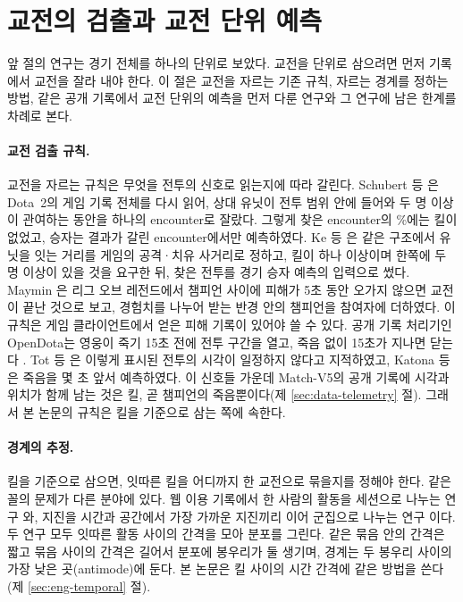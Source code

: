 \section{교전의 검출과 교전 단위 예측}
\label{sec:rel-encounter}

앞 절의 연구는 경기 전체를 하나의 단위로 보았다. 교전을 단위로 삼으려면 먼저 기록에서 교전을 잘라 내야 한다. 이 절은 교전을 자르는 기존 규칙, 자르는 경계를 정하는 방법, 같은 공개 기록에서 교전 단위의 예측을 먼저 다룬 연구와 그 연구에 남은 한계를 차례로 본다.

\paragraph{교전 검출 규칙.} 교전을 자르는 규칙은 무엇을 전투의 신호로 읽는지에 따라 갈린다. Schubert 등 \cite{schubert2016encounter}은 Dota~2의 게임 기록 전체를 다시 읽어, 상대 유닛이 전투 범위 안에 들어와 두 명 이상이 관여하는 동안을 하나의 encounter로 잘랐다. 그렇게 찾은 encounter의 \killlessSchubert{}\%에는 킬이 없었고, 승자는 결과가 갈린 encounter에서만 예측하였다. Ke 등 \cite{ke2022}은 같은 구조에서 유닛을 잇는 거리를 게임의 공격·치유 사거리로 정하고, 킬이 하나 이상이며 한쪽에 두 명 이상이 있을 것을 요구한 뒤, 찾은 전투를 경기 승자 예측의 입력으로 썼다. Maymin \cite{maymin2021smart}은 리그 오브 레전드에서 챔피언 사이에 피해가 5초 동안 오가지 않으면 교전이 끝난 것으로 보고, 경험치를 나누어 받는 반경 안의 챔피언을 참여자에 더하였다. 이 규칙은 게임 클라이언트에서 얻은 피해 기록이 있어야 쓸 수 있다. 공개 기록 처리기인 OpenDota는 영웅이 죽기 15초 전에 전투 구간을 열고, 죽음 없이 15초가 지나면 닫는다 \cite{opendota2018processteamfights}. Tot 등 \cite{tot2021camera}은 이렇게 표시된 전투의 시각이 일정하지 않다고 지적하였고, Katona 등 \cite{katona2019time}은 죽음을 몇 초 앞서 예측하였다. 이 신호들 가운데 Match-V5의 공개 기록에 시각과 위치가 함께 남는 것은 킬, 곧 챔피언의 죽음뿐이다(제 \ref{sec:data-telemetry} 절). 그래서 본 논문의 규칙은 킬을 기준으로 삼는 쪽에 속한다.

\paragraph{경계의 추정.} 킬을 기준으로 삼으면, 잇따른 킬을 어디까지 한 교전으로 묶을지를 정해야 한다. 같은 꼴의 문제가 다른 분야에 있다. 웹 이용 기록에서 한 사람의 활동을 세션으로 나누는 연구 \cite{halfaker2015session,mehrzadi2012session}와, 지진을 시간과 공간에서 가장 가까운 지진끼리 이어 군집으로 나누는 연구 \cite{zaliapin2013clusters,zaliapin2022perspectives}이다. 두 연구 모두 잇따른 활동 사이의 간격을 모아 분포를 그린다. 같은 묶음 안의 간격은 짧고 묶음 사이의 간격은 길어서 분포에 봉우리가 둘 생기며, 경계는 두 봉우리 사이의 가장 낮은 곳(antimode)에 둔다. 본 논문은 킬 사이의 시간 간격에 같은 방법을 쓴다(제 \ref{sec:eng-temporal} 절).

